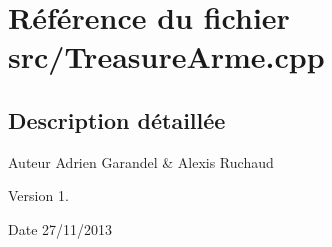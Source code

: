 \section{Référence du fichier src/\-Treasure\-Arme.cpp}
\label{_treasure_arme_8cpp}


\subsection{Description détaillée}
\begin{DoxyAuthor}{Auteur}
Adrien Garandel \& Alexis Ruchaud 
\end{DoxyAuthor}
\begin{DoxyVersion}{Version}
1. 
\end{DoxyVersion}
\begin{DoxyDate}{Date}
27/11/2013 
\end{DoxyDate}
